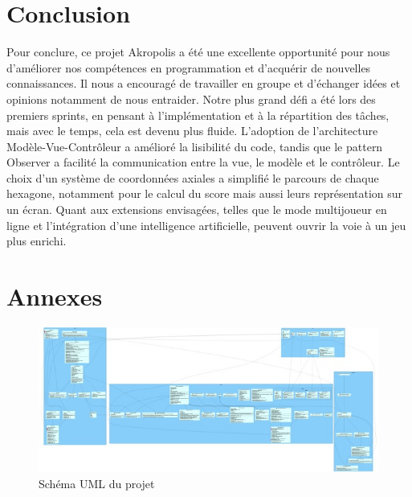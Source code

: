 \documentclass{article}
\begin{document}
    \section{Conclusion}\label{sec:conclusion}

    Pour conclure, ce projet Akropolis a été une excellente opportunité pour nous d’améliorer nos compétences en programmation et d’acquérir de nouvelles connaissances. Il nous a encouragé de travailler en groupe et d’échanger idées et opinions notamment de nous entraider.
    Notre plus grand défi a été lors des premiers sprints, en pensant à l’implémentation et à la répartition des tâches, mais avec le temps, cela est devenu plus fluide.
    L’adoption de l’architecture Modèle-Vue-Contrôleur a amélioré la lisibilité du code, tandis que le pattern Observer a facilité la communication entre la vue, le modèle et le contrôleur. Le choix d’un système de coordonnées axiales a simplifié le parcours de chaque hexagone, notamment pour le calcul du score mais aussi leurs représentation sur un écran.
    Quant aux extensions envisagées, telles que le mode multijoueur en ligne et l’intégration d’une intelligence artificielle, peuvent ouvrir la voie à un jeu plus enrichi.

    
    \section{Annexes}\label{sec:annexes}
    \begin{figure}[H]
        \centering
        \includegraphics[width=\textwidth]{UML.png}
        \caption{Schéma UML du projet}
        \end{figure}
\end{document}
